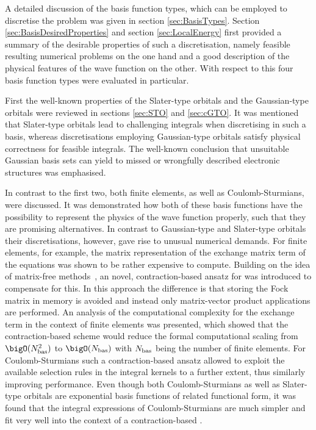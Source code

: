 
A detailed discussion of the basis function types,
which can be employed to discretise the \HF problem
was given in section \ref{sec:BasisTypes}.
Section \ref{sec:BasisDesiredProperties} and section \ref{sec:LocalEnergy}
first provided a summary of the desirable properties of such a discretisation,
namely feasible resulting numerical problems on the one hand
and a good description of the physical features of the wave function
on the other.
With respect to this
four basis function types were evaluated in particular.

First the well-known properties of the Slater-type orbitals
and the Gaussian-type orbitals were reviewed
in sections \ref{sec:STO} and \ref{sec:cGTO}.
It was mentioned that Slater-type orbitals lead to challenging
integrals when discretising \HF in such a basis,
whereas discretisations employing Gaussian-type orbitals
satisfy physical correctness
for feasible integrals.
The well-known conclusion
that unsuitable Gaussian basis sets can yield to missed or wrongfully
described electronic structures
was emphasised.

In contrast to the first two,
both finite elements,
as well as Coulomb-Sturmians,
were discussed.
It was demonstrated how both of these basis functions have the possibility
to represent the physics of the wave function properly,
such that they are promising alternatives.
In contrast to Gaussian-type and Slater-type orbitals
their discretisations, however,
gave rise to unusual numerical demands.
For finite elements, for example,
the matrix representation of the exchange matrix term of the \HF equations
was shown to be rather expensive to compute.
Building on the idea of matrix-free methods~\cite{Kronbichler2012},
an novel, contraction-based ansatz for \HF was introduced
to compensate for this.
In this approach the difference is that storing the Fock matrix in memory
is avoided and instead only matrix-vector product applications are performed.
An analysis of the computational complexity
for the exchange term in the context of finite elements was presented,
which showed that the contraction-based scheme
would reduce the formal computational scaling from $\bigO(\Nbas^2)$
to $\bigO(\Nbas)$ with $N_\text{bas}$ being the number of finite elements.
For Coulomb-Sturmians such a contraction-based \SCF ansatz
allowed to exploit the available selection rules in the integral kernels
to a further extent,
thus similarly improving performance.
Even though both Coulomb-Sturmians as well as Slater-type
orbitals are exponential basis functions
of related functional form,
it was found that the integral expressions of Coulomb-Sturmians are much simpler
and fit very well into the context of a contraction-based \SCF.

